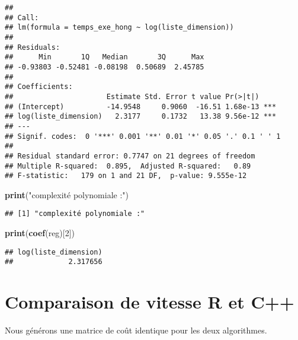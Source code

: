 \documentclass[
]{article}
\newenvironment{Shaded}{\begin{snugshade}}{\end{snugshade}}
\newcommand{\DecValTok}[1]{\textcolor[rgb]{0.00,0.00,0.81}{#1}}
\newcommand{\FunctionTok}[1]{\textcolor[rgb]{0.13,0.29,0.53}{\textbf{#1}}}
\newcommand{\NormalTok}[1]{#1}
\newcommand{\StringTok}[1]{\textcolor[rgb]{0.31,0.60,0.02}{#1}}
\begin{document}
\begin{verbatim}
## 
## Call:
## lm(formula = temps_exe_hong ~ log(liste_dimension))
## 
## Residuals:
##      Min       1Q   Median       3Q      Max 
## -0.93803 -0.52481 -0.08198  0.50689  2.45785 
## 
## Coefficients:
##                      Estimate Std. Error t value Pr(>|t|)    
## (Intercept)          -14.9548     0.9060  -16.51 1.68e-13 ***
## log(liste_dimension)   2.3177     0.1732   13.38 9.56e-12 ***
## ---
## Signif. codes:  0 '***' 0.001 '**' 0.01 '*' 0.05 '.' 0.1 ' ' 1
## 
## Residual standard error: 0.7747 on 21 degrees of freedom
## Multiple R-squared:  0.895,  Adjusted R-squared:   0.89 
## F-statistic:   179 on 1 and 21 DF,  p-value: 9.555e-12
\end{verbatim}

\begin{Shaded}
\begin{Highlighting}[]
\FunctionTok{print}\NormalTok{(}\StringTok{"complexité polynomiale :"}\NormalTok{)}
\end{Highlighting}
\end{Shaded}

\begin{verbatim}
## [1] "complexité polynomiale :"
\end{verbatim}

\begin{Shaded}
\begin{Highlighting}[]
\FunctionTok{print}\NormalTok{(}\FunctionTok{coef}\NormalTok{(reg)[}\DecValTok{2}\NormalTok{])}
\end{Highlighting}
\end{Shaded}

\begin{verbatim}
## log(liste_dimension) 
##             2.317656
\end{verbatim}

\hypertarget{comparaison-de-vitesse-r-et-c}{%
\section{Comparaison de vitesse R et
C++}\label{comparaison-de-vitesse-r-et-c}}

Nous générons une matrice de coût identique pour les deux algorithmes.
\end{document}
